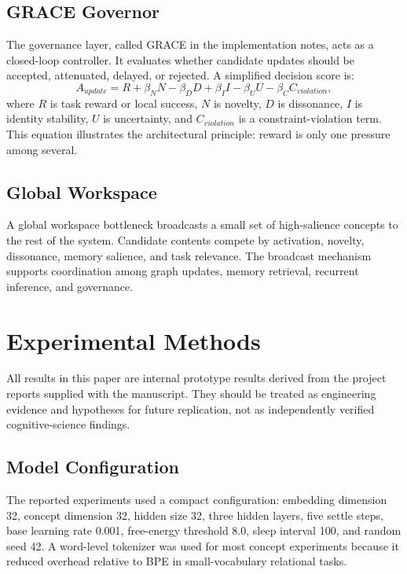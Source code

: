 \documentclass[11pt]{article}
\begin{document}
\subsection{GRACE Governor}
The governance layer, called GRACE in the implementation notes, acts as a closed-loop controller. It evaluates whether candidate updates should be accepted, attenuated, delayed, or rejected. A simplified decision score is:
\begin{equation}
 A_{update}=R + \beta_N N - \beta_D D + \beta_I I - \beta_U U - \beta_C C_{violation},
\end{equation}
where $R$ is task reward or local success, $N$ is novelty, $D$ is dissonance, $I$ is identity stability, $U$ is uncertainty, and $C_{violation}$ is a constraint-violation term. This equation illustrates the architectural principle: reward is only one pressure among several.

\subsection{Global Workspace}
A global workspace bottleneck broadcasts a small set of high-salience concepts to the rest of the system. Candidate contents compete by activation, novelty, dissonance, memory salience, and task relevance. The broadcast mechanism supports coordination among graph updates, memory retrieval, recurrent inference, and governance.

\section{Experimental Methods}
All results in this paper are internal prototype results derived from the project reports supplied with the manuscript. They should be treated as engineering evidence and hypotheses for future replication, not as independently verified cognitive-science findings.

\subsection{Model Configuration}
The reported experiments used a compact configuration: embedding dimension 32, concept dimension 32, hidden size 32, three hidden layers, five settle steps, base learning rate 0.001, free-energy threshold 8.0, sleep interval 100, and random seed 42. A word-level tokenizer was used for most concept experiments because it reduced overhead relative to BPE in small-vocabulary relational tasks.
\end{document}
